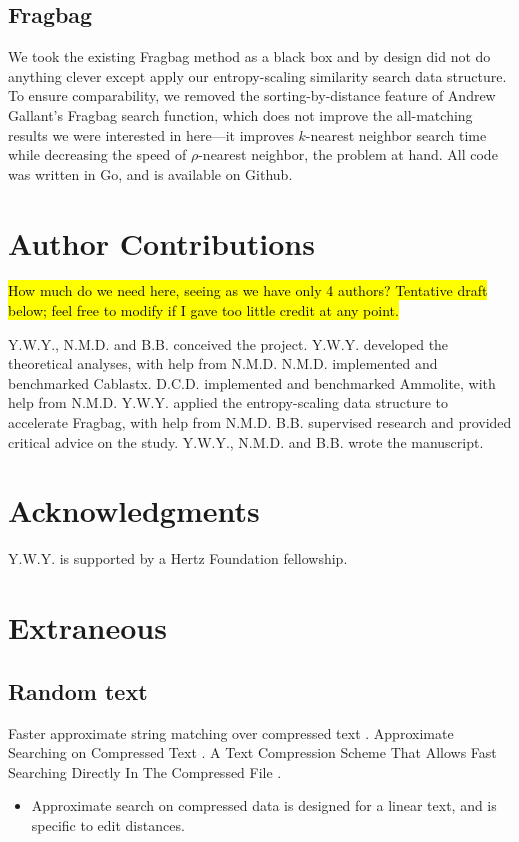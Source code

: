 \documentclass[review,preprint,12pt]{elsarticle}
\renewcommand{\cite}{\citep} %
\theoremstyle{definition}
\theoremstyle{remark}
\numberwithin{equation}{section}
\begin{document}
\subsection{Fragbag}
We took the existing Fragbag method as a black box and by design did not do anything clever except apply our entropy-scaling similarity search data structure.
To ensure comparability, we removed the sorting-by-distance feature of Andrew Gallant's Fragbag search function, which does not improve the all-matching results we were interested in here---it improves $k$-nearest neighbor search time while decreasing the speed of $\rho$-nearest neighbor, the problem at hand.
All code was written in Go, and is available on Github.

\section{Author Contributions}
\hl{How much do we need here, seeing as we have only 4 authors? Tentative draft below; feel free to modify if I gave too little credit at any point.}

Y.W.Y., N.M.D. and B.B. conceived the project.
Y.W.Y. developed the theoretical analyses, with help from N.M.D.
N.M.D. implemented and benchmarked Cablastx.
D.C.D. implemented and benchmarked Ammolite, with help from N.M.D.
Y.W.Y. applied the entropy-scaling data structure to accelerate Fragbag, with help from N.M.D.
B.B. supervised research and provided critical advice on the study.
Y.W.Y., N.M.D. and B.B. wrote the manuscript.

\section{Acknowledgments}
Y.W.Y. is supported by a Hertz Foundation fellowship.


%


\newpage

\appendix
\section{Extraneous}
\subsection{Random text}

Faster approximate string matching over compressed text \cite{navarro2001faster}.
Approximate Searching on Compressed Text \cite{perez2005approximate}.
A Text Compression Scheme That Allows Fast Searching Directly In The Compressed File \cite{manber93atext}.
\begin{itemize}
\item Approximate search on compressed data is designed for a linear text, and is specific to edit distances.
\end{itemize}
\end{document}
